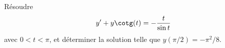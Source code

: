 

\begin{exercice}\label{exo_II-1-04}

Résoudre
\begin{equation}
	y'+y\cotg(t)=-\frac{ t }{ \sin t }
\end{equation}
avec $0<t<\pi$, et déterminer la solution telle que $y(\pi/2)=-\pi^2/8$.

\end{exercice}
